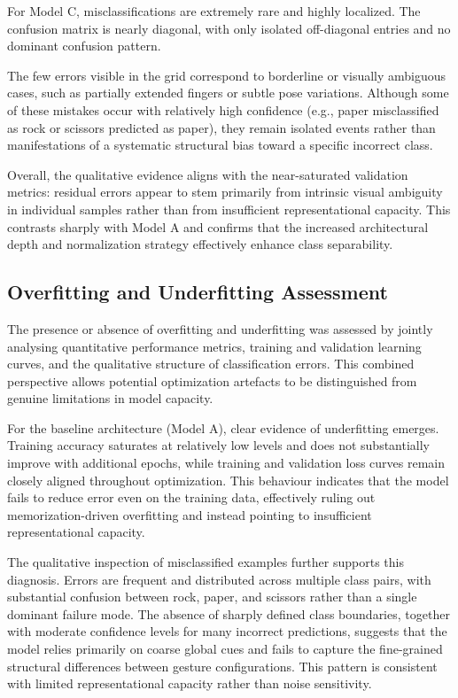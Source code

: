 \documentclass{article}
\begin{document}
For Model C, misclassifications are extremely rare and highly localized. 
The confusion matrix is nearly diagonal, with only isolated off-diagonal 
entries and no dominant confusion pattern. 

The few errors visible in the grid correspond to borderline or visually 
ambiguous cases, such as partially extended fingers or subtle pose 
variations. Although some of these mistakes occur with relatively high 
confidence (e.g., paper misclassified as rock or scissors predicted as 
paper), they remain isolated events rather than manifestations of a 
systematic structural bias toward a specific incorrect class.

Overall, the qualitative evidence aligns with the near-saturated validation 
metrics: residual errors appear to stem primarily from intrinsic visual 
ambiguity in individual samples rather than from insufficient 
representational capacity. This contrasts sharply with Model A and confirms 
that the increased architectural depth and normalization strategy 
effectively enhance class separability.

\subsection{Overfitting and Underfitting Assessment}

The presence or absence of overfitting and underfitting was assessed by
jointly analysing quantitative performance metrics, training and
validation learning curves, and the qualitative structure of
classification errors. This combined perspective allows potential
optimization artefacts to be distinguished from genuine limitations in
model capacity.

For the baseline architecture (Model A), clear evidence of underfitting emerges.
Training accuracy saturates at relatively low levels and does not
substantially improve with additional epochs, while training and
validation loss curves remain closely aligned throughout
optimization. This behaviour indicates that the model fails to reduce
error even on the training data, effectively ruling out
memorization-driven overfitting and instead pointing to insufficient
representational capacity.

The qualitative inspection of misclassified examples further supports
this diagnosis. Errors are frequent and distributed across multiple
class pairs, with substantial confusion between rock, paper, and
scissors rather than a single dominant failure mode. The absence of
sharply defined class boundaries, together with moderate confidence
levels for many incorrect predictions, suggests that the model relies
primarily on coarse global cues and fails to capture the fine-grained
structural differences between gesture configurations. This pattern is
consistent with limited representational capacity rather than noise
sensitivity.
\end{document}
